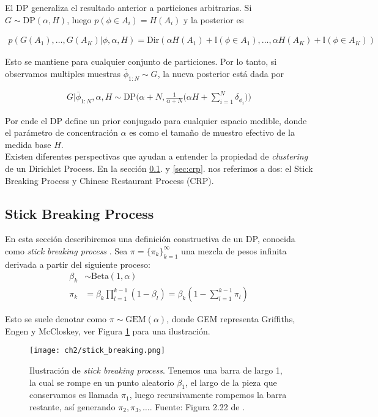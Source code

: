 El DP generaliza el resultado anterior a particiones arbitrarias. Si $G\sim \text{DP}(\alpha, H)$, luego $p(\phi \in A_{i})=H(A_{i})$ y la posterior es

\begin{align}
    p(G(A_{1}), \ldots, G(A_{K})|\phi, \alpha, H) = \text{Dir}(\alpha H(A_{1})+\mathbb{I}(\phi \in A_{1}), \ldots, \alpha H(A_{K})+\mathbb{I}(\phi \in A_{K}))
\end{align}

Esto se mantiene para cualquier conjunto de particiones. Por lo tanto, si observamos multiples muestras $\bar{\phi}_{1:N}\sim G$, la nueva posterior está dada por 

\begin{align}
G|\bar{\phi}_{1:N}, \alpha, H \sim \text{DP}\bigg(\alpha+N, \frac{1}{\alpha+N}\bigg(\alpha H+\sum_{i=1}^{N}\delta_{\phi_{i}}\bigg)\bigg)
\end{align}

Por ende el DP define un prior conjugado para cualquier espacio medible, donde el parámetro de concentración $\alpha$ es como el tamaño de muestro efectivo de la medida base $H$.\\

Existen diferentes perspectivas que ayudan a entender la propiedad de \textit{clustering} de un Dirichlet Process. En la sección \ref{sec:sbp}. y \ref{sec:crp}. nos referimos a dos: el Stick Breaking Process y Chinese Restaurant Process (CRP).

\subsection{Stick Breaking Process}
\label{sec:sbp}

En esta sección describiremos una definición constructiva de un DP, conocida como \textit{stick breaking process} \citep{sethuraman1994constructive}. Sea $\pi=\{\pi_{k}\}_{k=1}^{\infty}$ una mezcla de pesos infinita derivada a partir del siguiente proceso:
\begin{align}
    \beta_{k} & \sim \text{Beta}(1, \alpha)\\
    \pi_{k} & = \beta_{k}\prod_{l=1}^{k-1}(1-\beta_{l}) = \beta_{k}(1-\sum_{l=1}^{k-1}\pi_{l})
\end{align}

Esto se suele denotar como $\pi \sim \text{GEM}(\alpha)$, donde GEM representa Griffiths, Engen y McCloskey, ver Figura  \ref{img:stick_breaking} para una ilustración. 

\begin{figure}
    \centering
    \texttt{[image: ch2/stick\_breaking.png]}
    \caption{Ilustración de \textit{stick breaking process}. Tenemos una barra de largo 1, la cual se rompe en un punto aleatorio $\beta_{1}$, el largo de la pieza que conservamos es llamada $\pi_{1}$, luego recursivamente rompemos la barra restante, así generando $\pi_{2}, \pi_{3}, \ldots$. Fuente: Figura 2.22 de \citep{sudderth2006graphical}.}
    \label{img:stick_breaking}
\end{figure}

